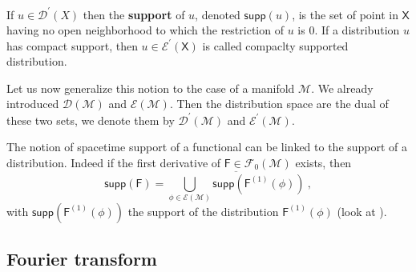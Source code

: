 \documentclass[10pt]{book}
\newcommand{\supp}{\mathsf{supp}}
\newcommand{\Dcal}{\mathcal{D}}
\newcommand{\Ecal}{\mathcal{E}}
\newcommand{\Fcal}{\mathcal{F}}
\newcommand{\Mcal}{\mathcal{M}}
\newcommand{\Fsf}{\mathsf{F}}
\newcommand{\Xsf}{\mathsf{X}}
\theoremstyle{break}
\begin{document}
\bigskip


If $u\in\Dcal^\prime(X)$ then the \textbf{support} of $u$, denoted $\supp(u)$, is the set of point in $\Xsf$ having no open neighborhood to which the restriction of $u$ is $0$. If a distribution $u$ has compact support, then $u \in \Ecal^\prime(\Xsf)$ is called compaclty supported distribution.


\bigskip


Let us now generalize this notion to the case of a manifold $\Mcal$. We already introduced $\Dcal(\Mcal)$ and $\Ecal(\Mcal)$. Then the distribution space are the dual of these two sets, we denote them by $\Dcal^\prime(\Mcal)$ and $\Ecal^\prime(\Mcal)$.


\bigskip


The notion of spacetime support of a functional can be linked to the support of a distribution. Indeed if the first derivative of $\Fsf\in\Fcal_0(\Mcal)$ exists, then
%
\begin{equation*}
\supp\left(\Fsf\right) = \overline{\bigcup_{\phi\in\Ecal(\Mcal)} \supp\left(\Fsf^{(1)}(\phi)\right)} \ ,
\end{equation*}
%
with $\supp\left(\Fsf^{(1)}(\phi)\right)$ the support of the distribution $\Fsf^{(1)}(\phi)$ (look at \cite{brunetti_algebraic_2012}).


\subsection{Fourier transform}
\end{document}
